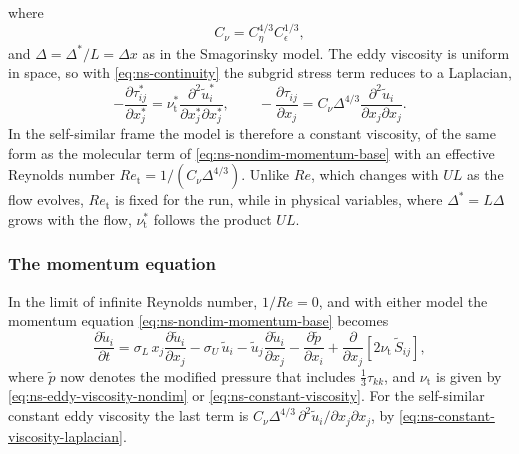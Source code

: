 \documentclass{article}
\begin{document}
where
\begin{equation}\label{eq:ns-constant-viscosity-coeff}
  C_\nu = C_\eta^{4/3} C_\epsilon^{1/3},
\end{equation}
and $\Delta = \Delta^*/L = \Delta x$ as in the Smagorinsky model. The eddy
viscosity is uniform in space, so with \eqref{eq:ns-continuity} the subgrid
stress term reduces to a Laplacian,
\begin{equation}\label{eq:ns-constant-viscosity-laplacian}
  -\frac{\partial \tau_{ij}^*}{\partial x_j^*}
  = \nu_{\mathrm{t}}^* \frac{\partial^2 \tilde u_i^*}{\partial x_j^* \partial x_j^*},
  \qquad
  -\frac{\partial \tau_{ij}}{\partial x_j}
  = C_\nu \Delta^{4/3} \frac{\partial^2 \tilde u_i}{\partial x_j \partial x_j}.
\end{equation}
In the self-similar frame the model is therefore a constant viscosity, of the
same form as the molecular term of \eqref{eq:ns-nondim-momentum-base} with an
effective Reynolds number $Re_{\mathrm{t}} = 1/(C_\nu \Delta^{4/3})$. Unlike $Re$,
which changes with $UL$ as the flow evolves, $Re_{\mathrm{t}}$ is fixed for the
run, while in physical variables, where $\Delta^* = L\Delta$ grows with the
flow, $\nu_{\mathrm{t}}^*$ follows the product $UL$.

\subsubsection*{The momentum equation}
In the limit of infinite Reynolds number, $1/Re = 0$, and with either model the
momentum equation \eqref{eq:ns-nondim-momentum-base} becomes
\begin{equation}\label{eq:ns-nondim-momentum}
  \frac{\partial \tilde u_i}{\partial t}
  = \sigma_L\, x_j \frac{\partial \tilde u_i}{\partial x_j}
  - \sigma_U\, \tilde u_i
  - \tilde u_j \frac{\partial \tilde u_i}{\partial x_j}
  - \frac{\partial \tilde p}{\partial x_i}
  + \frac{\partial}{\partial x_j}\left[ 2 \nu_{\mathrm{t}}\, \tilde S_{ij} \right],
\end{equation}
where $\tilde p$ now denotes the modified pressure that includes
$\frac{1}{3}\tau_{kk}$, and $\nu_{\mathrm{t}}$ is given by
\eqref{eq:ns-eddy-viscosity-nondim} or \eqref{eq:ns-constant-viscosity}. For the
self-similar constant eddy viscosity the last term is
$C_\nu \Delta^{4/3}\, \partial^2 \tilde u_i / \partial x_j \partial x_j$, by
\eqref{eq:ns-constant-viscosity-laplacian}.
\end{document}
